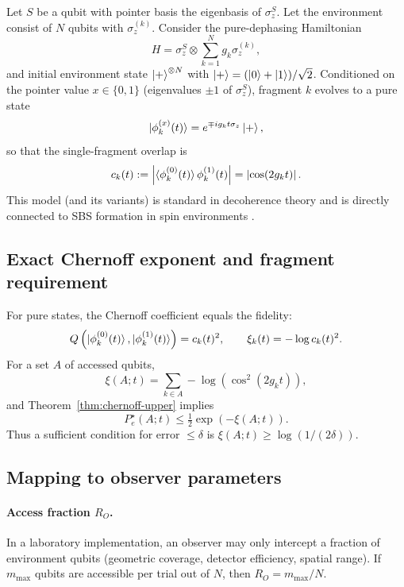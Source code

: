 \documentclass[11pt]{article}
\newcommand{\1}{\mathbf{1}}
\newcommand{\QCBcoef}{Q}
\newcommand{\QCBdist}{\xi}
\theoremstyle{definition}
\theoremstyle{plain}
\begin{document}
Let $S$ be a qubit with pointer basis the eigenbasis of $\sigma_z^S$.
Let the environment consist of $N$ qubits with $\sigma_z^{(k)}$.
Consider the pure-dephasing Hamiltonian
\begin{equation}
H = \sigma_z^S \otimes \sum_{k=1}^N g_k \sigma_z^{(k)},
\label{eq:centralspin-H}
\end{equation}
and initial environment state $\ket{+}^{\otimes N}$ with $\ket{+}=(\ket{0}+\ket{1})/\sqrt{2}$.
Conditioned on the pointer value $x\in\{0,1\}$ (eigenvalues $\pm1$ of $\sigma_z^S$), fragment $k$ evolves to a pure state
\[
\ket{\phi_k^{(x)}(t)} = e^{\mp i g_k t \sigma_z}\ket{+},
\]
so that the single-fragment overlap is
\begin{equation}
c_k(t):=\left|\braket{\phi_k^{(0)}(t)}{\phi_k^{(1)}(t)}\right|=\left|\cos(2 g_k t)\right|.
\label{eq:ck}
\end{equation}
This model (and its variants) is standard in decoherence theory and is directly connected to SBS formation in spin environments \citep{KorbiczReview2021,RoszakKorbicz2019}.

\subsection{Exact Chernoff exponent and fragment requirement}

For pure states, the Chernoff coefficient equals the fidelity:
\[
\QCBcoef\left(\ket{\phi_k^{(0)}(t)},\ket{\phi_k^{(1)}(t)}\right)=c_k(t)^2,
\qquad
\QCBdist_k(t)=-\log c_k(t)^2.
\]
For a set $A$ of accessed qubits,
\begin{equation}
\QCBdist(A;t)=\sum_{k\in A} -\log\left(\cos^2(2 g_k t)\right),
\label{eq:xi-centralspin}
\end{equation}
and Theorem~\ref{thm:chernoff-upper} implies
\[
P_e^\star(A;t)\le \tfrac12 \exp\!\left(-\QCBdist(A;t)\right).
\]
Thus a sufficient condition for error $\le\delta$ is $\QCBdist(A;t)\ge \log(1/(2\delta))$.

\subsection{Mapping to observer parameters}

\paragraph{Access fraction $R_O$.}
In a laboratory implementation, an observer may only intercept a fraction of environment qubits (geometric coverage, detector efficiency, spatial range).
If $m_{\max}$ qubits are accessible per trial out of $N$, then $R_O=m_{\max}/N$.
\end{document}
